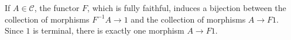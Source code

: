 If $A \in \mathcal{C}$, the functor $F$, which is fully faithful, induces a
bijection between
the collection of morphisms $F^{-1}A \to 1$ and the collection of
morphisms $A \to F1$. Since $1$ is terminal, there is exactly one morphism
$A \to F1$.
